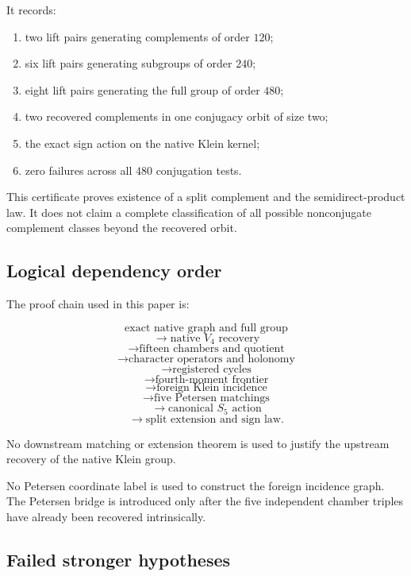 It records:

\begin{enumerate}
    \item two lift pairs generating complements of order \(120\);
    \item six lift pairs generating subgroups of order \(240\);
    \item eight lift pairs generating the full group of order \(480\);
    \item two recovered complements in one conjugacy orbit of size two;
    \item the exact sign action on the native Klein kernel;
    \item zero failures across all \(480\) conjugation tests.
\end{enumerate}

This certificate proves existence of a split complement and the
semidirect-product law. It does not claim a complete classification of
all possible nonconjugate complement classes beyond the recovered
orbit.

\subsection{Logical dependency order}

The proof chain used in this paper is:

\[
\text{exact native graph and full group}
\]
\[
\longrightarrow
\text{native }V_4\text{ recovery}
\]
\[
\longrightarrow
\text{fifteen chambers and quotient}
\]
\[
\longrightarrow
\text{character operators and holonomy}
\]
\[
\longrightarrow
\text{registered cycles}
\]
\[
\longrightarrow
\text{fourth-moment frontier}
\]
\[
\longrightarrow
\text{foreign Klein incidence}
\]
\[
\longrightarrow
\text{five Petersen matchings}
\]
\[
\longrightarrow
\text{canonical }S_5\text{ action}
\]
\[
\longrightarrow
\text{split extension and sign law}.
\]

No downstream matching or extension theorem is used to justify the
upstream recovery of the native Klein group.

No Petersen coordinate label is used to construct the foreign
incidence graph. The Petersen bridge is introduced only after the five
independent chamber triples have already been recovered intrinsically.

\subsection{Failed stronger hypotheses}

